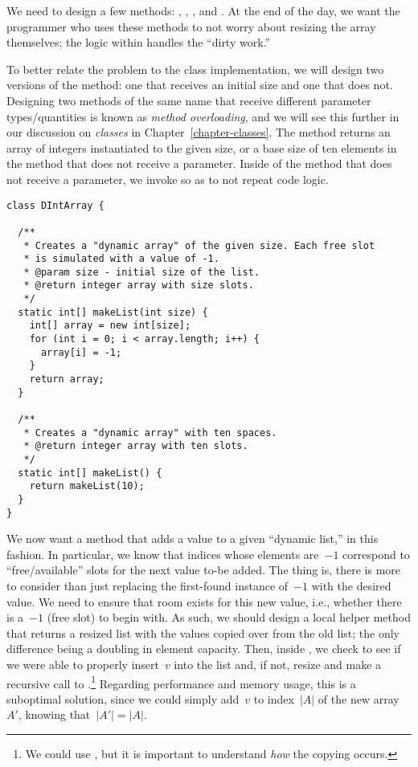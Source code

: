 We need to design a few methods: , , , and . 
At the end of the day, we want the programmer who uses these methods to not worry about resizing the array themselves; the logic within handles the ``dirty work.''

To better relate the problem to the  class implementation, we will design two versions of the  method: one that receives an initial size and one that does not. 
Designing two methods of the same name that receive different parameter types/quantities is known as \emph{method overloading}, and we will see this further in our discussion on \emph{classes} in Chapter~\ref{chapter-classes}. 
The  method returns an array of integers instantiated to the given size, or a base size of ten elements in the method that does not receive a parameter. 
Inside of the  method that does not receive a parameter, we invoke  so as to not repeat code logic.

\begin{lstlisting}[language=MyJava]
class DIntArray {

  /**
   * Creates a "dynamic array" of the given size. Each free slot
   * is simulated with a value of -1.
   * @param size - initial size of the list.
   * @return integer array with size slots.
   */
  static int[] makeList(int size) {
    int[] array = new int[size];
    for (int i = 0; i < array.length; i++) {
      array[i] = -1;
    }
    return array;
  }

  /**
   * Creates a "dynamic array" with ten spaces.
   * @return integer array with ten slots.
   */
  static int[] makeList() {
    return makeList(10);
  }
}
\end{lstlisting}

We now want a method that adds a value to a given ``dynamic list,'' in this fashion. 
In particular, we know that indices whose elements are~$-1$ correspond to ``free/available'' slots for the next value to-be added. 
The thing is, there is more to consider than just replacing the first-found instance of~$-1$ with the desired value. 
We need to ensure that room exists for this new value, i.e., whether there is a~$-1$ (free slot) to begin with. 
As such, we should design a local helper method that returns a resized list with the values copied over from the old list; the only difference being a doubling in element capacity. 
Then, inside , we check to see if we were able to properly insert~$v$ into the list and, if not, resize and make a recursive call to .\footnote{We could use , but it is important to understand \emph{how} the copying occurs.} 
Regarding performance and memory usage, this is a suboptimal solution, since we could simply add~$v$ to index~$|A|$ of the new array~$A'$, knowing that~$|A'| = |A|$.

